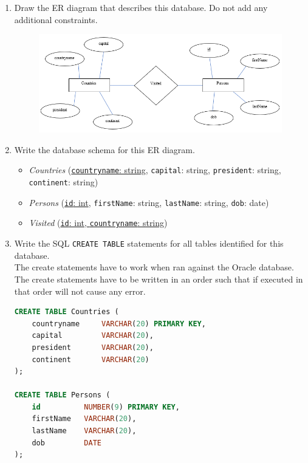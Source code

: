 \documentclass[letterpaper, 11pt]{article}
\begin{document}
\begin{enumerate}[label={\alph*}),leftmargin=*]
    \item Draw the ER diagram that describes this database. Do not add any additional constraints.
    \begin{figure}[H]
        \centering
        \includegraphics[scale=0.7]{hw2-2a.png}
    \end{figure}
    \item Write the database schema for this ER diagram.

    \begin{itemize}
        \item \textit{Countries} (\ul{\texttt{countryname}: string}, \texttt{capital}: string, \texttt{president}: string, \texttt{continent}: string)
        \item \textit{Persons} (\ul{\texttt{id}: int}, \texttt{firstName}: string, \texttt{lastName}: string, \texttt{dob}: date)
        \item \textit{Visited} (\ul{\texttt{id}: int, \texttt{countryname}: string})
    \end{itemize}
    
    \item Write the SQL \texttt{CREATE TABLE} statements for all tables identified for this database.\\
    The create statements have to work when ran against the Oracle database.\\
    The create statements have to be written in an order such that if executed in that order will not cause any error.
\begin{tcolorbox}
    \begin{lstlisting}[language=SQL]
CREATE TABLE Countries (
    countryname     VARCHAR(20) PRIMARY KEY,
    capital         VARCHAR(20),
    president       VARCHAR(20),
    continent       VARCHAR(20)
);

CREATE TABLE Persons (
    id          NUMBER(9) PRIMARY KEY,
    firstName   VARCHAR(20),
    lastName    VARCHAR(20),
    dob         DATE
);


\end{lstlisting}
\end{tcolorbox}
\end{enumerate}
\end{document}
